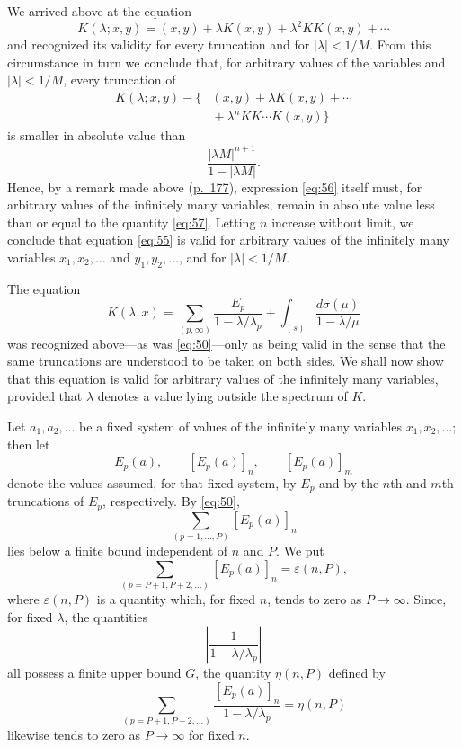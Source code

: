 \documentclass[b5paper,twoside]{article}
\newcommand{\originalpage}[1]{\phantomsection\label{origpage:#1}}
\begin{document}
We arrived above at the equation
\begin{equation}
\tag{55}\label{eq:55}
  K(\lambda;x,y)
  =(x,y)+\lambda K(x,y)+\lambda^2KK(x,y)+\cdots
\end{equation}
and recognized its validity for every truncation and for
$\lvert\lambda\rvert<1/M$.  From this circumstance in turn we conclude that,
for arbitrary values of the variables and $\lvert\lambda\rvert<1/M$, every
truncation of
\begin{equation}
\tag{56}\label{eq:56}
\begin{aligned}
  K(\lambda;x,y)-\bigl\{&(x,y)+\lambda K(x,y)+\cdots\\
  &{}+\lambda^nKK\cdots K(x,y)\bigr\}
\end{aligned}
\end{equation}
is smaller in absolute value than
\begin{equation}
\tag{57}\label{eq:57}
  \frac{\lvert\lambda M\rvert^{n+1}}
       {1-\lvert\lambda M\rvert}.
\end{equation}
Hence, by a remark made above (\hyperref[origpage:177]{p.~177}), expression
\eqref{eq:56} itself must, for arbitrary values of the infinitely many
variables, remain in absolute value less than or equal to the quantity
\eqref{eq:57}.  Letting $n$ increase without limit, we conclude that equation
\eqref{eq:55} is valid for arbitrary values of the infinitely many variables
$x_1,x_2,\ldots$ and $y_1,y_2,\ldots$, and for
$\lvert\lambda\rvert<1/M$.

\originalpage{187}
The equation
\[
  K(\lambda,x)
  =\sum_{(p,\infty)}\frac{E_p}{1-\lambda/\lambda_p}
   +\int_{(s)}\frac{d\sigma(\mu)}{1-\lambda/\mu}
\]
was recognized above---as was \eqref{eq:50}---only as being valid in the
sense that the same truncations are understood to be taken on both sides.
We shall now show that this equation is valid for arbitrary values of the
infinitely many variables, provided that $\lambda$ denotes a value lying
outside the spectrum of $K$.

Let $a_1,a_2,\ldots$ be a fixed system of values of the infinitely many
variables $x_1,x_2,\ldots$; then let
\[
  E_p(a),\qquad [E_p(a)]_n,\qquad [E_p(a)]_m
\]
denote the values assumed, for that fixed system, by $E_p$ and by the $n$th
and $m$th truncations of $E_p$, respectively.  By \eqref{eq:50},
\[
  \sum_{(p=1,\ldots,P)}[E_p(a)]_n
\]
lies below a finite bound independent of $n$ and $P$.  We put
\[
  \sum_{(p=P+1,P+2,\ldots)}[E_p(a)]_n=\varepsilon(n,P),
\]
where $\varepsilon(n,P)$ is a quantity which, for fixed $n$, tends to zero as
$P\to\infty$.  Since, for fixed $\lambda$, the quantities
\[
  \left\lvert\frac{1}{1-\lambda/\lambda_p}\right\rvert
\]
all possess a finite upper bound $G$, the quantity $\eta(n,P)$ defined by
\[
  \sum_{(p=P+1,P+2,\ldots)}
  \frac{[E_p(a)]_n}{1-\lambda/\lambda_p}=\eta(n,P)
\]
likewise tends to zero as $P\to\infty$ for fixed $n$.
\end{document}
